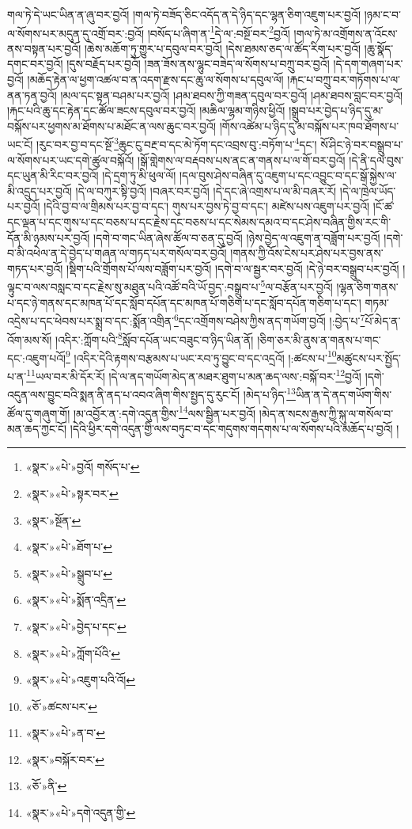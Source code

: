 གལ་ཏེ་དེ་ཡང་ཡིན་ན་ཞུ་བར་བྱའོ། །གལ་ཏེ་བཟོད་ཅིང་འདོད་ན་དེ་ཉིད་དང་ལྷན་ཅིག་འཇུག་པར་བྱའོ། །ཉམ་ང་བ་ལ་སོགས་པར་མདུན་དུ་འགྲོ་བར་:བྱའོ། །བསོད་པ་ཞིག་ན་\footnote{«སྣར་»«པེ་»བྱའོ། གསོད་པ་}དེ་ལ་:བསྔོ་བར་\footnote{«སྣར་»«པེ་»སྟར་བར་}བྱའོ། །གལ་ཏེ་མ་འགྲོགས་ན་འོངས་ནས་བསྟན་པར་བྱའོ། །ཆེས་མཆོག་ཏུ་གྱུར་པ་དབུལ་བར་བྱའོ། །དེས་ཐམས་ཅད་ལ་ཚོད་རིག་པར་བྱའོ། །ཆུ་སྣོད་དགང་བར་བྱའོ། །དུས་བརྗོད་པར་བྱའོ། །ཟན་ཟོས་ནས་ལྷུང་བཟེད་ལ་སོགས་པ་བཀྲུ་བར་བྱའོ། །དེ་དག་གཞག་པར་བྱའོ། །མཆོད་རྟེན་ལ་ཕྱག་འཚལ་བ་ན་འདག་རྫས་དང་ཆུ་ལ་སོགས་པ་དབུལ་ལོ། །རྐང་པ་བཀྲུ་བར་གཏོགས་པ་ལ་ནན་ཏན་བྱའོ། །མལ་དང་སྟན་བཤམ་པར་བྱའོ། །ཤམ་ཐབས་ཀྱི་གཟན་དབུལ་བར་བྱའོ། །ཤམ་ཐབས་བླང་བར་བྱའོ། །རྐང་པའི་ཆུ་དང་རྟེན་དང་ཚོལ་ཟངས་དབུལ་བར་བྱའོ། །མཆིལ་ལྷམ་གཉིས་ཕྱིའོ། །སྒྲུབ་པར་བྱེད་པ་ཉིད་དུ་མ་བསྐོས་པར་ཕྱགས་མ་ཐོགས་པ་མཐོང་ན་ལས་ཆུང་བར་བྱའོ། །གོས་འཚེམ་པ་ཉིད་དུ་མ་བསྐོས་པར་ཁབ་ཐོགས་པ་ཡང་ངོ། །རུང་བར་བྱ་བ་དང་སྔོ་\footnote{«སྣར་»སྔོན་}ཆུང་ངུ་བརྔ་བ་དང་མེ་ཏོག་དང་འབྲས་བུ་:བཏོག་པ་\footnote{«སྣར་»«པེ་»ཐོག་པ་}དང་། སོ་ཤིང་ཉེ་བར་བསྒྲུབ་པ་ལ་སོགས་པར་ཡང་དགེ་ཚུལ་བསྐོའོ། །སྒོ་གླེགས་ལ་བརྡབས་པས་ནང་ན་གནས་པ་ལ་གོ་བར་བྱའོ། །དེ་ནི་དལ་བུས་དང་ཡུན་མི་རིང་བར་བྱའོ། །དེ་དྲག་ཏུ་མི་ཕུལ་ལོ། །དལ་བུས་ཤེས་བཞིན་དུ་འཇུག་པ་དང་འབྱུང་བ་དང་སྒོ་སྐྱེས་ལ་མི་འདྲུད་པར་བྱའོ། །དེ་ལ་བཀུར་སྟི་བྱའོ། །བཞར་བར་བྱའོ། །དེ་དང་ཞེ་འགྲས་པ་ལ་མི་བཞར་རོ། །དེ་ལ་ཁྲེལ་ཡོད་པར་བྱའོ། །དེའི་བྱ་བ་ལ་གྲིམས་པར་བྱ་བ་དང་། གུས་པར་བྱས་ཏེ་བྱ་བ་དང་། མཛེས་པས་འཇུག་པར་བྱའོ། །ངོ་ཚ་དང་ལྡན་པ་དང་གུས་པ་དང་བཅས་པ་དང་རྗེས་དང་བཅས་པ་དང་སེམས་དམའ་བ་དང་ཤེས་བཞིན་གྱིས་རང་གི་དོན་མི་ཉམས་པར་བྱའོ། །དགེ་བ་གང་ཡིན་ཞེས་ཚོལ་བ་ཅན་དུ་བྱའོ། །ཉེས་བྱེད་ལ་འཇུག་ན་བཟློག་པར་བྱའོ། །དགེ་བ་མི་འཕེལ་ན་དེ་བྱེད་པ་གཞན་ལ་གཏད་པར་གསོལ་བར་བྱའོ། །གནས་ཀྱི་འོས་ངེས་པར་ཤེས་པར་བྱས་ནས་གཏད་པར་བྱའོ། །སྡིག་པའི་གྲོགས་པོ་ལས་བཟློག་པར་བྱའོ། །དགེ་བ་ལ་སྦྱར་བར་བྱའོ། །དེ་ཉེ་བར་བསྒྲུབ་པར་བྱའོ། །ལྟུང་བ་ལས་བསླང་བ་དང་རྗེས་སུ་མཐུན་པའི་འཚོ་བའི་ཡོ་བྱད་:བསྒྲུབ་པ་\footnote{«སྣར་»«པེ་»སྒྲུབ་པ་}ལ་བརྩོན་པར་བྱའོ། །ལྷན་ཅིག་གནས་པ་དང་ཉེ་གནས་དང་མཁན་པོ་དང་སློབ་དཔོན་དང་མཁན་པོ་གཅིག་པ་དང་སློབ་དཔོན་གཅིག་པ་དང་། གཏམ་འདྲེས་པ་དང་ཕེབས་པར་སྨྲ་བ་དང་:སྨོན་འགྲིན་\footnote{«སྣར་»«པེ་»སྨོན་འདྲིན་}དང་འགྲོགས་བཤེས་ཀྱིས་ནད་གཡོག་བྱའོ། །:བྱེད་པ་\footnote{«སྣར་»«པེ་»བྱེད་པ་དང་}པོ་མེད་ན་འོག་མས་སོ། །འདིར་:ཀློག་པའི་\footnote{«སྣར་»«པེ་»ཀློག་པོའི་}སློབ་དཔོན་ཡང་བཟུང་བ་ཉིད་ཡིན་ནོ། །ཅིག་ཅར་མི་ནུས་ན་གནས་པ་གང་དང་:འཇུག་པའོ།\footnote{«སྣར་»«པེ་»འཇུག་པའི་འོ།} །འདིར་དེའི་རྟགས་བརྩམས་པ་ཡང་རབ་ཏུ་བྱུང་བ་དང་འདྲའོ། །:ཚངས་པ་\footnote{«ཅོ་»ཚངས་པར་}མཚུངས་པར་སྤྱོད་པ་ན་\footnote{«སྣར་»«པེ་»ན་བ་}ཡལ་བར་མི་དོར་རོ། །དེ་ལ་ནད་གཡོག་མེད་ན་མཐར་ཐུག་པ་མན་ཆད་ལས་:བསྐོ་བར་\footnote{«སྣར་»བསྐོར་བར་}བྱའོ། །དགེ་འདུན་ལས་བྱུང་བའི་སྨན་ནི་ནད་པ་འབའ་ཞིག་གིས་སྤྱད་དུ་རུང་ངོ། །མེད་པ་ཉིད་\footnote{«ཅོ་»ནི་}ཡིན་ན་དེ་ནད་གཡོག་གིས་ཚོལ་དུ་གཞུག་གོ། །མ་འབྱོར་ན་:དགེ་འདུན་གྱིས་\footnote{«སྣར་»«པེ་»དགེ་འདུན་གྱི་}ལས་སྦྱིན་པར་བྱའོ། །མེད་ན་སངས་རྒྱས་ཀྱི་སྐུ་ལ་གསོལ་བ་མན་ཆད་ཀྱང་ངོ། །དེའི་ཕྱིར་དགེ་འདུན་གྱི་ལས་བཏུང་བ་དང་གདུགས་གདགས་པ་ལ་སོགས་པའི་མཆོད་པ་བྱའོ། །
